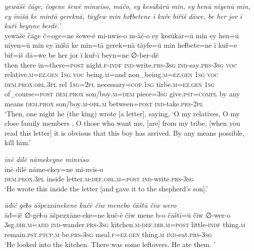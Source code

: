 \ea \label{KŠ.56}
\textit{yewāšē čāge, čogene šewē minwīso, māčo, ey kesūkārū min, ey henū nīyenū min, ey īnīšā ke mintā gereknā, tāyfew min heɫbetene ī kuře biřiš dāwe, be her jor ī kuřī beynne berdē.’} \\ 
\gll yewāšē čāge č=oge=ne šewe-ē mi-nwīs-o m-āč-o ey kesūkār=ū min ey hen=ū nīyen=ū min ey īnīšā ke min=tā gerek=nā tāyfe=ū min heɫbete=ne ī kuř=e biř=iš dā=we be her jor ī kuř-ī beyn=ne ∅-ber-dē \\ 
 then there in=there\textsc{=\textsc{post}} night\textsc{.f}\textsc{-indf} \textsc{ind-}write\textsc{.prs}\textsc{-3sg} \textsc{ind-}say\textsc{.prs}\textsc{-3sg} \textsc{voc} relative\textsc{.m}\textsc{\textsc{=ez.gen}} \textsc{1sg} \textsc{voc} being\textsc{.m}=and non\_being\textsc{.m}\textsc{\textsc{=ez.gen}} \textsc{1sg} \textsc{voc} \textsc{dem.prox}\textsc{.obl}\textsc{.3pl} rel \textsc{1sg}=\textsc{2pl} necessary\textsc{=cop}\textsc{.\textsc{1sg}} tirbe\textsc{.m}\textsc{\textsc{=ez.gen}} \textsc{1sg} of\_course\textsc{=\textsc{post}} \textsc{dem.prox} son/boy\textsc{.m}\textsc{=dem} piece\textsc{=3sg} give\textsc{.pst}\textsc{=compl} by any means \textsc{dem.prox} son/boy\textsc{.m}\textsc{-obl}\textsc{.m} between\textsc{=\textsc{post}} \textsc{ind-}take\textsc{.prs}-\textsc{2pl} \\ 
\glt `Then, one night he (the king) wrote [a letter], saying, ‘O my relatives, O my close family members , O those who want me, [are] from my tribe, [when you read this letter] it is obvious that this boy has arrived. By any means possible, kill him.'
\z 
 
\ea \label{KŠ.57}
\textit{īnē dilē nāmekeyne minvīso} \\ 
\gll īnē dilē nāme-ekey=ne mi-nvīs-o \\ 
 \textsc{dem.prox}\textsc{.3pl} inside letter\textsc{.m}\textsc{-def}\textsc{.obl}\textsc{.m}\textsc{=\textsc{post}} \textsc{ind-}write\textsc{.prs}\textsc{-3sg} \\ 
\glt `He wrote this inside the letter [and gave it to the shepherd’s son].'
\z 
 
\ea \label{KŠ.63}
\textit{āđīč gēɫo āšpezxānekene kučē čīw menebo čāštū čīw wero} \\ 
\gll āđ=īč ∅-gēɫ-o āšpezxāne-eke=ne kuč-ē čīw mene b-o čāštī=ū čīw ∅-wer-o \\ 
 3sg\textsc{.dir}\textsc{.m}\textsc{=add} \textsc{ind-}wander\textsc{.prs}\textsc{-3sg} kitchen\textsc{.m}\textsc{-def}\textsc{.dir}\textsc{.m}\textsc{=\textsc{post}} little\textsc{-indf} thing\textsc{.m} remain\textsc{.pst}\textsc{.ptcp}\textsc{.m} be\textsc{.prs}\textsc{-3sg} meal\textsc{.f}\textsc{\textsc{=ez.gen}} thing\textsc{.m} \textsc{ind-}eat\textsc{.prs}\textsc{-3sg} \\ 
\glt `He looked into the kitchen. There was some leftovers. He ate them. '
\z 
 
